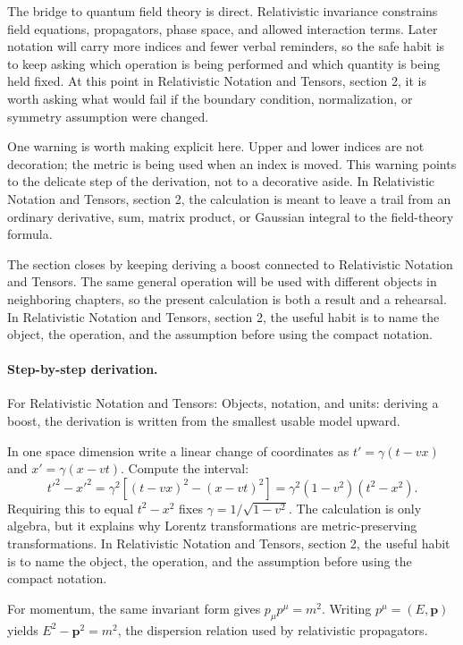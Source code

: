 The bridge to quantum field theory is direct.  Relativistic invariance constrains field equations, propagators, phase space, and allowed interaction terms.  Later notation will carry more indices and fewer verbal reminders, so the safe habit is to keep asking which operation is being performed and which quantity is being held fixed.  At this point in Relativistic Notation and Tensors, section 2, it is worth asking what would fail if the boundary condition, normalization, or symmetry assumption were changed.

One warning is worth making explicit here.  Upper and lower indices are not decoration; the metric is being used when an index is moved.  This warning points to the delicate step of the derivation, not to a decorative aside.  In Relativistic Notation and Tensors, section 2, the calculation is meant to leave a trail from an ordinary derivative, sum, matrix product, or Gaussian integral to the field-theory formula.

The section closes by keeping deriving a boost connected to Relativistic Notation and Tensors.  The same general operation will be used with different objects in neighboring chapters, so the present calculation is both a result and a rehearsal.  In Relativistic Notation and Tensors, section 2, the useful habit is to name the object, the operation, and the assumption before using the compact notation.



\paragraph{Step-by-step derivation.}

For Relativistic Notation and Tensors: Objects, notation, and units: deriving a boost, the derivation is written from the smallest usable model upward.

In one space dimension write a linear change of coordinates as \(t'=\gamma(t-vx)\) and \(x'=\gamma(x-vt)\).  Compute the interval:
\[
  t'^2-x'^2
  =
  \gamma^2[(t-vx)^2-(x-vt)^2]
  =
  \gamma^2(1-v^2)(t^2-x^2).
\]
Requiring this to equal \(t^2-x^2\) fixes \(\gamma=1/\sqrt{1-v^2}\).  The calculation is only algebra, but it explains why Lorentz transformations are metric-preserving transformations.  In Relativistic Notation and Tensors, section 2, the useful habit is to name the object, the operation, and the assumption before using the compact notation.

For momentum, the same invariant form gives \(p_\mu p^\mu=m^2\).  Writing \(p^\mu=(E,\bm p)\) yields \(E^2-\bm p^2=m^2\), the dispersion relation used by relativistic propagators.

